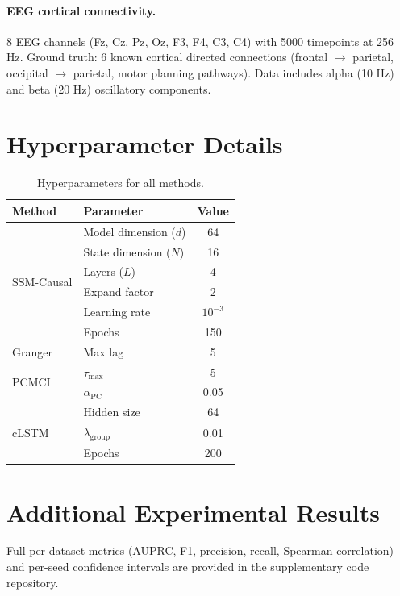 \documentclass{article}
\newcommand{\methodname}{SSM-Causal}
\begin{document}
\paragraph{EEG cortical connectivity.} 8 EEG channels (Fz, Cz, Pz, Oz,
F3, F4, C3, C4) with 5000 timepoints at 256 Hz. Ground truth: 6 known
cortical directed connections (frontal $\to$ parietal, occipital $\to$
parietal, motor planning pathways). Data includes alpha (10 Hz) and beta
(20 Hz) oscillatory components.

\section{Hyperparameter Details}
\label{app:hyperparams}

\begin{table}[h]
\centering
\caption{Hyperparameters for all methods.}
\begin{tabular}{llc}
\toprule
Method & Parameter & Value \\
\midrule
\multirow{6}{*}{\methodname{}} & Model dimension ($d$) & 64 \\
 & State dimension ($N$) & 16 \\
 & Layers ($L$) & 4 \\
 & Expand factor & 2 \\
 & Learning rate & $10^{-3}$ \\
 & Epochs & 150 \\
\midrule
Granger & Max lag & 5 \\
\midrule
\multirow{2}{*}{PCMCI} & $\tau_{\max}$ & 5 \\
 & $\alpha_{\text{PC}}$ & 0.05 \\
\midrule
\multirow{3}{*}{cLSTM} & Hidden size & 64 \\
 & $\lambda_{\text{group}}$ & 0.01 \\
 & Epochs & 200 \\
\bottomrule
\end{tabular}
\end{table}

\section{Additional Experimental Results}
\label{app:additional}

Full per-dataset metrics (AUPRC, F1, precision, recall, Spearman
correlation) and per-seed confidence intervals are provided in the
supplementary code repository.


\end{document}
